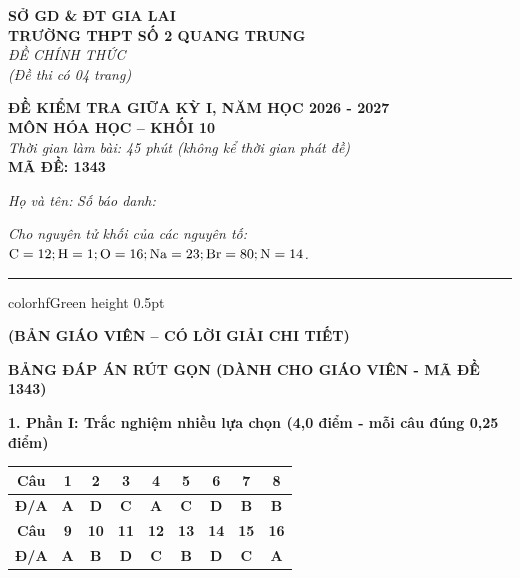 \documentclass[11pt,a4paper]{article}
\begin{document}
\begin{minipage}[t]{0.48\textwidth}
\textbf{SỞ GD \& ĐT GIA LAI}\\
\textbf{TRƯỜNG THPT SỐ 2 QUANG TRUNG}\\
\textit{ĐỀ CHÍNH THỨC}\\
\textit{(Đề thi có 04 trang)}
\end{minipage}
\hfill
\begin{minipage}[t]{0.48\textwidth}
\raggedleft
\textbf{\color{hfRed}ĐỀ KIỂM TRA GIỮA KỲ I, NĂM HỌC 2026 - 2027}\\
\textbf{MÔN HÓA HỌC -- KHỐI 10}\\
\textit{Thời gian làm bài: 45 phút (không kể thời gian phát đề)}\\
\textbf{MÃ ĐỀ: 1343}
\end{minipage}

\vspace{4pt}
\noindent
\textit{Họ và tên:} \dotfill \textit{Số báo danh:} \dotfill

\vspace{3pt}
\noindent
\textit{\footnotesize Cho nguyên tử khối của các nguyên tố: $\ce{C} = 12; \ce{H} = 1; \ce{O} = 16; \ce{Na} = 23; \ce{Br} = 80; \ce{N} = 14$.}

\vspace{3pt}
\hrule color{hfGreen} height 0.5pt

\vspace{4pt}
\begin{center}
\textbf{\color{hfRed}\large (BẢN GIÁO VIÊN -- CÓ LỜI GIẢI CHI TIẾT)}
\end{center}

\vspace{2pt}
\begin{center}
{\color{hfRed}\textbf{\large BẢNG ĐÁP ÁN RÚT GỌN (DÀNH CHO GIÁO VIÊN - MÃ ĐỀ 1343)}}
\end{center}

\vspace{2pt}
\noindent
\textbf{\color{mainGreen}1. Phần I: Trắc nghiệm nhiều lựa chọn (4,0 điểm - mỗi câu đúng 0,25 điểm)}
\begin{center}
\renewcommand{\arraystretch}{1.2}
\begin{tabular}{|c|c|c|c|c|c|c|c|c|}
\hline
\rowcolor{tableGreen}
\textbf{Câu} & \textbf{1} & \textbf{2} & \textbf{3} & \textbf{4} & \textbf{5} & \textbf{6} & \textbf{7} & \textbf{8} \\
\hline
\textbf{Đ/A} & \textbf{\color{hfRed}A} & \textbf{\color{hfRed}D} & \textbf{\color{hfRed}C} & \textbf{\color{hfRed}A} & \textbf{\color{hfRed}C} & \textbf{\color{hfRed}D} & \textbf{\color{hfRed}B} & \textbf{\color{hfRed}B} \\
\hline
\rowcolor{tableGreen}
\textbf{Câu} & \textbf{9} & \textbf{10} & \textbf{11} & \textbf{12} & \textbf{13} & \textbf{14} & \textbf{15} & \textbf{16} \\
\hline
\textbf{Đ/A} & \textbf{\color{hfRed}A} & \textbf{\color{hfRed}B} & \textbf{\color{hfRed}D} & \textbf{\color{hfRed}C} & \textbf{\color{hfRed}B} & \textbf{\color{hfRed}D} & \textbf{\color{hfRed}C} & \textbf{\color{hfRed}A} \\
\hline
\end{tabular}
\end{center}
\end{document}
